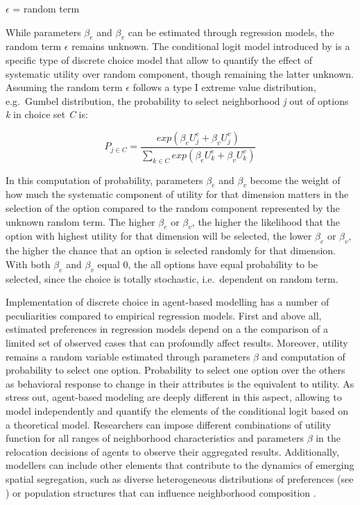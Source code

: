 \documentclass[
]{article}
\begin{document}
\(\epsilon\) = random term

\par

While parameters \(\beta_e\) and \(\beta_v\) can be estimated through
regression models, the random term \(\epsilon\) remains unknown. The
conditional logit model introduced by \cite{mcfadden1973conditional} is
a specific type of discrete choice model that allow to quantify the
effect of systematic utility over random component, though remaining the
latter unknown. Assuming the random term \(\epsilon\) follows a type I
extreme value distribution, e.g.~Gumbel distribution, the probability to
select neighborhood \textit{j} out of options \textit{k} in choice set
\textit{C} is:

\begin{equation}
P_{j\in{C}} = \frac{exp(\beta_e U^e_j + \beta_v U^v_j)}{\sum\limits_{{k\in{C}}}exp(\beta_e U^e_k + \beta_v U^v_k)}
\label{eq:cndtnl}
\end{equation}

In this computation of probability, parameters \(\beta_e\) and
\(\beta_v\) become the weight of how much the systematic component of
utility for that dimension matters in the selection of the option
compared to the random component represented by the unknown random term.
The higher \(\beta_e\) or \(\beta_v\), the higher the likelihood that
the option with highest utility for that dimension will be selected, the
lower \(\beta_e\) or \(\beta_v\), the higher the chance that an option
is selected randomly for that dimension. With both \(\beta_e\) and
\(\beta_v\) equal 0, the all options have equal probability to be
selected, since the choice is totally stochastic, i.e.~dependent on
random term.

Implementation of discrete choice in agent-based modelling has a number
of peculiarities compared to empirical regression models. First and
above all, estimated preferences in regression models depend on a the
comparison of a limited set of observed cases that can profoundly affect
results. Moreover, utility remains a random variable estimated through
parameters \(\beta\) and computation of probability to select one
option. Probability to select one option over the others as behavioral
response to change in their attributes is the equivalent to utility. As
\citep{bruch2009preferences} stress out, agent-based modeling are deeply
different in this aspect, allowing to model independently and quantify
the elements of the conditional logit based on a theoretical model.
Researchers can impose different combinations of utility function for
all ranges of neighborhood characteristics and parameters \(\beta\) in
the relocation decisions of agents to observe their aggregated results.
Additionally, modellers can include other elements that contribute to
the dynamics of emerging spatial segregation, such as diverse
heterogeneous distributions of preferences (see \citep{xie2012modeling})
or population structures that can influence neighborhood composition
\citep{bruch2014population}.
\end{document}
